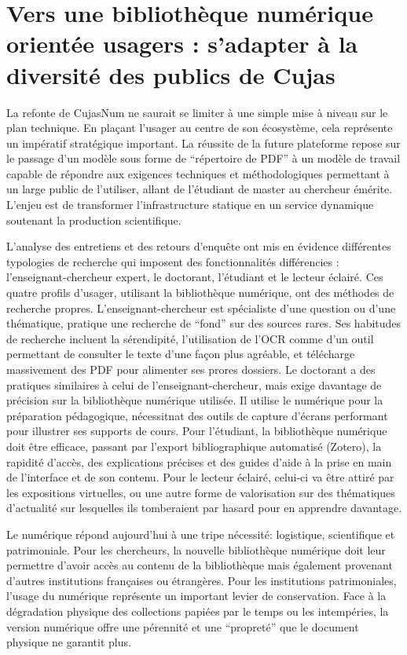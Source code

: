 \section[Diversité des publics]{Vers une bibliothèque numérique orientée usagers : s'adapter à la diversité des publics de Cujas}

La refonte de CujasNum ne saurait se limiter à une simple mise à niveau sur le plan technique. En plaçant l'usager au centre de son écosystème, cela représente un impératif stratégique important. La réussite de la future plateforme repose sur le passage d'un modèle sous forme de \enquote{répertoire de PDF} à un modèle de travail capable de répondre aux exigences techniques et méthodologiques permettant à un large public de l'utiliser, allant de l'étudiant de master au chercheur émérite. L'enjeu est de transformer l'infrastructure statique en un service dynamique soutenant la production scientifique.

L'analyse des entretiens et des retours d'enquête ont mis en évidence différentes typologies de recherche qui imposent des fonctionnalités différencies : l'enseignant-chercheur expert, le doctorant, l'étudiant et le lecteur éclairé. Ces quatre profils d'usager, utilisant la bibliothèque numérique, ont des méthodes de recherche propres. L'enseignant-chercheur est spécialiste d'une question ou d'une thématique, pratique une recherche de \enquote{fond} sur des sources rares. Ses habitudes de recherche incluent la sérendipité, l'utilisation de l'OCR comme d'un outil permettant de consulter le texte d'une façon plus agréable, et télécharge massivement des PDF pour alimenter ses prores dossiers. Le doctorant a des pratiques similaires à celui de l'enseignant-chercheur, mais exige davantage de précision sur la bibliothèque numérique utilisée. Il utilise le numérique pour la préparation pédagogique, nécessitnat des outils de capture d'écrans performant pour illustrer ses supports de cours. Pour l'étudiant, la bibliothèque numérique doit être efficace, passant par l'export bibliographique automatisé (Zotero), la rapidité d'accès, des explications précises et des guides d'aide à la prise en main de l'interface et de son contenu. Pour le lecteur éclairé, celui-ci va être attiré par les expositions virtuelles, ou une autre forme de valorisation sur des thématiques d'actualité sur lesquelles ils tomberaient par hasard pour en apprendre davantage.

Le numérique répond aujourd'hui à une tripe nécessité: logistique, scientifique et patrimoniale. Pour les chercheurs, la nouvelle bibliothèque numérique doit leur permettre d'avoir accès au contenu de la bibliothèque mais également provenant d'autres institutions françaises ou étrangères. Pour les institutions patrimoniales, l'usage du numérique représente un important levier de conservation. Face à la dégradation physique des collections papiées par le temps ou les intempéries, la version numérique offre une pérennité et une \enquote{propreté} que le document physique ne garantit plus. 
 
